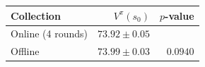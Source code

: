 \begin{tabular}{lrr}
\hline
Collection & $V^\pi(s_0)$ & $p$-value \\
\hline
Online (4 rounds) & $73.92 \pm 0.05$ & \\
Offline & $73.99 \pm 0.03$ & $0.0940$ \\
\hline
\end{tabular}
